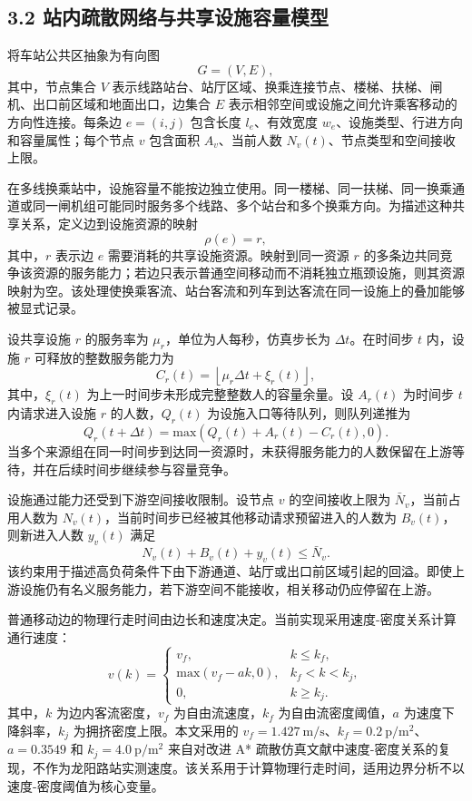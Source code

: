 \documentclass[UTF8,a4paper,12pt]{ctexart}
\begin{document}
\subsection{3.2 站内疏散网络与共享设施容量模型}

将车站公共区抽象为有向图
\[
G=(V,E),
\]
其中，节点集合 \(V\) 表示线路站台、站厅区域、换乘连接节点、楼梯、扶梯、闸机、出口前区域和地面出口，边集合 \(E\) 表示相邻空间或设施之间允许乘客移动的方向性连接。每条边 \(e=(i,j)\) 包含长度 \(l_e\)、有效宽度 \(w_e\)、设施类型、行进方向和容量属性；每个节点 \(v\) 包含面积 \(A_v\)、当前人数 \(N_v(t)\)、节点类型和空间接收上限。

在多线换乘站中，设施容量不能按边独立使用。同一楼梯、同一扶梯、同一换乘通道或同一闸机组可能同时服务多个线路、多个站台和多个换乘方向。为描述这种共享关系，定义边到设施资源的映射
\[
\rho(e)=r,
\]
其中，\(r\) 表示边 \(e\) 需要消耗的共享设施资源。映射到同一资源 \(r\) 的多条边共同竞争该资源的服务能力；若边只表示普通空间移动而不消耗独立瓶颈设施，则其资源映射为空。该处理使换乘客流、站台客流和列车到达客流在同一设施上的叠加能够被显式记录。

设共享设施 \(r\) 的服务率为 \(\mu_r\)，单位为人每秒，仿真步长为 \(\Delta t\)。在时间步 \(t\) 内，设施 \(r\) 可释放的整数服务能力为
\[
C_r(t)=\left\lfloor \mu_r\Delta t+\xi_r(t)\right\rfloor ,
\]
其中，\(\xi_r(t)\) 为上一时间步未形成完整整数人的容量余量。设 \(A_r(t)\) 为时间步 \(t\) 内请求进入设施 \(r\) 的人数，\(Q_r(t)\) 为设施入口等待队列，则队列递推为
\[
Q_r(t+\Delta t)=\mathrm{max}\left(Q_r(t)+A_r(t)-C_r(t),0\right).
\]
当多个来源组在同一时间步到达同一资源时，未获得服务能力的人数保留在上游等待，并在后续时间步继续参与容量竞争。

设施通过能力还受到下游空间接收限制。设节点 \(v\) 的空间接收上限为 \(\bar N_v\)，当前占用人数为 \(N_v(t)\)，当前时间步已经被其他移动请求预留进入的人数为 \(B_v(t)\)，则新进入人数 \(y_v(t)\) 满足
\[
N_v(t)+B_v(t)+y_v(t)\leq \bar N_v .
\]
该约束用于描述高负荷条件下由下游通道、站厅或出口前区域引起的回溢。即使上游设施仍有名义服务能力，若下游空间不能接收，相关移动仍应停留在上游。

普通移动边的物理行走时间由边长和速度决定。当前实现采用速度-密度关系计算通行速度：
\[
v(k)=
\begin{cases}
v_f, & k\leq k_f,\\
\mathrm{max}(v_f-ak,0), & k_f<k<k_j,\\
0, & k\geq k_j .
\end{cases}
\]
其中，\(k\) 为边内客流密度，\(v_f\) 为自由流速度，\(k_f\) 为自由流密度阈值，\(a\) 为速度下降斜率，\(k_j\) 为拥挤密度上限。本文采用的 \(v_f=1.427\ \mathrm{m/s}\)、\(k_f=0.2\ \mathrm{p/m^2}\)、\(a=0.3549\) 和 \(k_j=4.0\ \mathrm{p/m^2}\) 来自对改进 A* 疏散仿真文献中速度-密度关系的复现，不作为龙阳路站实测速度。该关系用于计算物理行走时间，适用边界分析不以速度-密度阈值为核心变量。
\end{document}
